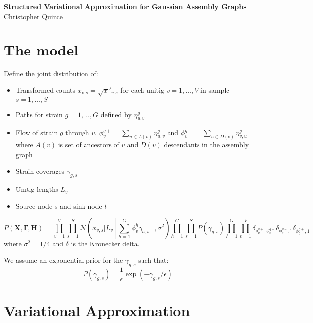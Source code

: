 \documentclass[10pt]{article}
\date{}
\newcommand\titlestring{Structured Variational Approximation for Gaussian Assembly Graphs}
\newcommand\authorstring{Christopher Quince}
\begin{document}
\begin{flushleft}
  {\Large
    \textbf{\titlestring}
  }
\\
\authorstring
\end{flushleft}

\section{The model}

Define the joint distribution of: 
\begin{itemize}

\item Transformed counts $x_{v,s} = \sqrt x'_{v,s}$ for each unitig $v = 1,\ldots,V$ in sample $s = 1,\ldots,S$

\item Paths for strain $g = 1,\ldots,G$ defined by $\eta^g_{u,v}$

\item Flow of strain $g$ through $v$, $\phi^{g+}_v = \sum_{u \in A(v)} \eta^g_{u,v}$ 
and $\phi^{g-}_v = \sum_{u \in D(v)} \eta^g_{v,u}$ where $A(v)$ is set of ancestors of $v$ 
and $D(v)$ descendants in the assembly graph

\item Strain coverages $\gamma_{g,s}$

\item Unitig lengths $L_v$

\item Source node $s$ and sink node $t$

\end{itemize}

\begin{equation}
P(\mathbf{X},\mathbf{\Gamma},\mathbf{H})  = \prod_{v=1}^V \prod_{s=1}^S \mathcal{N}(x_{v,s}|L_v [\sum_{h=1}^G \phi^h_v \gamma_{h,s}],\sigma^2) 
\prod_{h=1}^G \prod_{s=1}^S P(\gamma_{g,s})
\prod_{h=1}^G \prod_{v=1}^V \delta_{ \phi^{g+}_v, \phi^{g-}_v}
 \delta_{\phi^{g-}_s,1}  \delta_{\phi^{g+}_t,1} 
\end{equation}
where $\sigma^2 = 1/4$ and $\delta$ is the Kronecker delta.

We assume an exponential prior for the $\gamma_{g,s}$ such that:
\begin{equation}
P(\gamma_{g,s}) = \frac{1}{\epsilon} \exp(-\gamma_{g,s}/\epsilon)
\end{equation}

\section{Variational Approximation}
\end{document}
